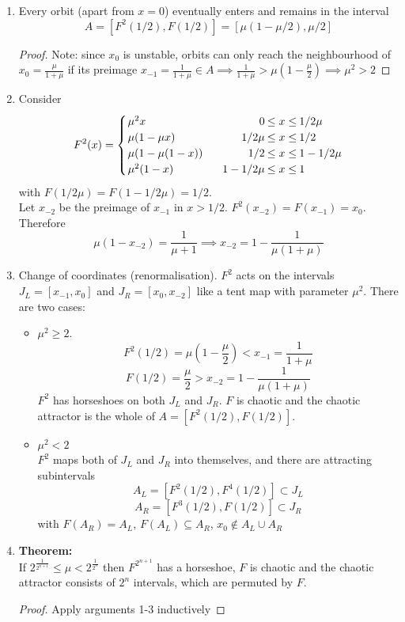 \documentclass{article}
\newcommand{\theorem}{\textbf{Theorem:}}                    %
\begin{document}
\begin{enumerate}[1.]
\item Every orbit (apart from $x=0$) eventually enters and remains in the 
      interval \[A = [F^2(1/2),F(1/2)] = [\mu(1-\mu/2),\mu/2]\]
      \begin{proof} %
      Note: since $x_0$ is unstable, orbits can only reach the neighbourhood 
      of $x_0 = \frac{\mu}{1+\mu}$ if its preimage $x_{-1} = \frac{1}{1+\mu}
      \in A \implies \frac{1}{1+\mu} > \mu(1-\frac{\mu}{2}) \implies \mu^2 >2 $
      \end{proof}
\item Consider
      \[\arraycolsep=1.1pt\def\arraystretch{1.2} F^2(x)= \left\{ \begin{array}{lcrcl}
      \mu^2 x         &~\quad& 0        &\leq x \leq& 1/2\mu \\
      \mu(1-\mu x)    &~\quad& 1/2\mu   &\leq x \leq& 1/2 \\
      \mu(1-\mu(1-x)) &~\quad& 1/2      &\leq x \leq& 1-1/2\mu \\
      \mu^2(1-x)      &~\quad& 1-1/2\mu &\leq x \leq& 1 
      \end{array} \right. \]
      with $F(1/2\mu) = F(1-1/2\mu) = 1/2$. \\
      Let $x_{-2}$ be the preimage of $x_{-1}$ in $x>1/2$. $F^2(x_{-2})=F(x_{-1})
      = x_0$. Therefore 
     \[\mu(1-x_{-2}) = \frac{1}{\mu+1} \implies x_{-2} = 1 - 
     \frac{1}{\mu(1+\mu)} \]
\item Change of coordinates (renormalisation). $F^2$ acts on the intervals 
      $J_L = [x_{-1},x_0]$ and $J_R = [x_0, x_{-2}]$ like a tent map with
      parameter $\mu^2$. There are two cases:
      \begin{itemize}
      \item $\mu^2 \geq 2$.
            \[ F^2(1/2) = \mu(1-\frac{\mu}{2}) < x_{-1}=\frac{1}{1+\mu}\]
            \[ F(1/2) = \frac{\mu}{2} > x_{-2}=1-\frac{1}{\mu(1+\mu)}\]
            $F^2$ has horseshoes on both $J_L$ and $J_R$. $F$ is chaotic and
            the chaotic attractor is the whole of $A = [F^2(1/2),F(1/2)]$.
      \item $\mu^2 <2$ \\
            $F^2$ maps both of $J_L$ and $J_R$ into themselves, and there are
            attracting subintervals
            \[ A_L = [F^2(1/2), F^4(1/2)] \subset J_L\]
            \[ A_R = [F^3(1/2), F(1/2)] \subset J_R\]
            with $F(A_R)=A_L$, $F(A_L) \subseteq A_R$, $x_0 \not \in A_L \cup A_R$
      \end{itemize}
\item \theorem\ \\
      If $\displaystyle 2^{\frac{1}{2^{n+1}}} \leq \mu < 2^{\frac{1}{2^n}}$ then
      $F^{2^{n+1}}$ has a horseshoe, $F$ is chaotic and the chaotic attractor
      consists of $2^n$ intervals, which are permuted by $F$.
      \begin{proof} Apply arguments 1-3 inductively \end{proof}
\end{enumerate}
\end{document}
